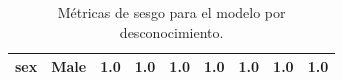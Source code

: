 \documentclass[oneside,openright,titlepage,numbers=noenddot,openany,headinclude,footinclude=true,
cleardoublepage=empty,abstractoff,BCOR=5mm,paper=a4,fontsize=12pt,main=spanish]{scrreprt}
\begin{document}
\begin{table}[H]
{\begin{tabular}{|c|c|c|c|c|c|c|c|c|}
\textbf{sex}                                                      & Male                                                               & {\color[HTML]{3166FF} 1.0}                                       & {\color[HTML]{3166FF} 1.0}                                       & {\color[HTML]{3166FF} 1.0}                                       & {\color[HTML]{3166FF} 1.0}                                       & {\color[HTML]{3166FF} 1.0}                                       & {\color[HTML]{3166FF} 1.0}                                       & {\color[HTML]{3166FF} 1.0}                                       \\ \hline
\end{tabular}
}
\caption{Métricas de sesgo para el modelo por desconocimiento.}
\label{tab:sesgounaware}
\end{table}

\clearpage
\end{document}
